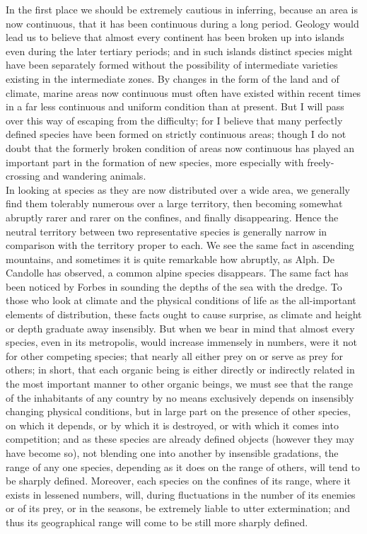 \indent In the first place we should be extremely cautious in inferring, because an area is now continuous, that it has been continuous during a long period. Geology would lead us to believe that almost every continent has been broken up into islands even during the later tertiary periods; and in such islands distinct species might have been separately formed without the possibility of intermediate varieties existing in the intermediate zones. By changes in the form of the land and of climate, marine areas now continuous must often have existed within recent times in a far less continuous and uniform condition than at present. But I will pass over this way of escaping from the difficulty; for I believe that many perfectly defined species have been formed on strictly continuous areas; though I do not doubt that the formerly broken condition of areas now continuous has played an important part in the formation of new species, more especially with freely-crossing and wandering animals.\\
\indent In looking at species as they are now distributed over a wide area, we generally find them tolerably numerous over a large territory, then becoming somewhat abruptly rarer and rarer on the confines, and finally disappearing. Hence the neutral territory between two representative species is generally narrow in comparison with the territory proper to each. We see the same fact in ascending mountains, and sometimes it is quite remarkable how abruptly, as Alph. De Candolle has observed, a common alpine species disappears. The same fact has been noticed by Forbes in sounding the depths of the sea with the dredge. To those who look at climate and the physical conditions of life as the all-important elements of distribution, these facts ought to cause surprise, as climate and height or depth graduate away insensibly. But when we bear in mind that almost every species, even in its metropolis, would increase immensely in numbers, were it not for other competing species; that nearly all either prey on or serve as prey for others; in short, that each organic being is either directly or indirectly related in the most important manner to other organic beings, we must see that the range of the inhabitants of any country by no means exclusively depends on insensibly changing physical conditions, but in large part on the presence of other species, on which it depends, or by which it is destroyed, or with which it comes into competition; and as these species are already defined objects (however they may have become so), not blending one into another by insensible gradations, the range of any one species, depending as it does on the range of others, will tend to be sharply defined. Moreover, each species on the confines of its range, where it exists in lessened numbers, will, during fluctuations in the number of its enemies or of its prey, or in the seasons, be extremely liable to utter extermination; and thus its geographical range will come to be still more sharply defined.\\
